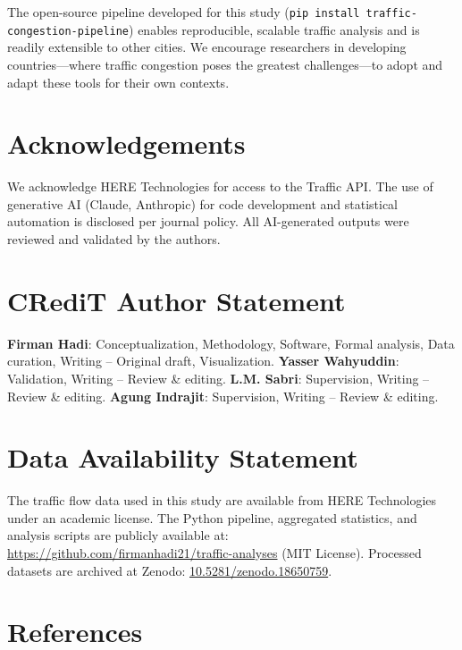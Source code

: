 \documentclass[12pt,a4paper]{article}
\begin{document}
The open-source pipeline developed for this study (\texttt{pip install traffic-congestion-pipeline}) enables reproducible, scalable traffic analysis and is readily extensible to other cities. We encourage researchers in developing countries---where traffic congestion poses the greatest challenges---to adopt and adapt these tools for their own contexts.

\section{Acknowledgements}

We acknowledge HERE Technologies for access to the Traffic API. The use of generative AI (Claude, Anthropic) for code development and statistical automation is disclosed per journal policy. All AI-generated outputs were reviewed and validated by the authors.

\section{CRediT Author Statement}

\textbf{Firman Hadi}: Conceptualization, Methodology, Software, Formal analysis, Data curation, Writing -- Original draft, Visualization.
\textbf{Yasser Wahyuddin}: Validation, Writing -- Review \& editing.
\textbf{L.M. Sabri}: Supervision, Writing -- Review \& editing.
\textbf{Agung Indrajit}: Supervision, Writing -- Review \& editing.

\section{Data Availability Statement}

The traffic flow data used in this study are available from HERE Technologies under an academic license. The Python pipeline, aggregated statistics, and analysis scripts are publicly available at: \url{https://github.com/firmanhadi21/traffic-analyses} (MIT License). Processed datasets are archived at Zenodo: \href{https://doi.org/10.5281/zenodo.18650759}{10.5281/zenodo.18650759}.

\section*{References}
\end{document}
